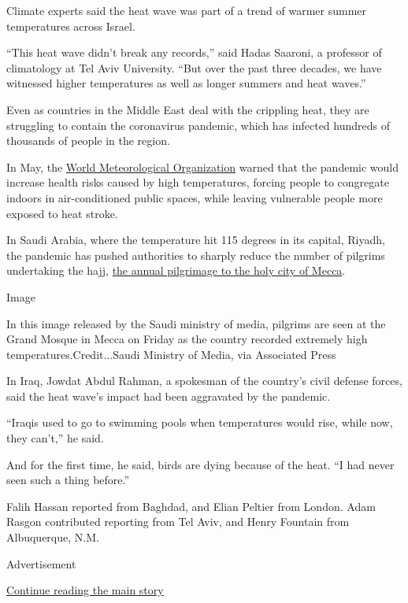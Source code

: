 Climate experts said the heat wave was part of a trend of warmer summer
temperatures across Israel.

``This heat wave didn't break any records,'' said Hadas Saaroni, a
professor of climatology at Tel Aviv University. ``But over the past
three decades, we have witnessed higher temperatures as well as longer
summers and heat waves.''

Even as countries in the Middle East deal with the crippling heat, they
are struggling to contain the coronavirus pandemic, which has infected
hundreds of thousands of people in the region.

In May, the
\href{https://public.wmo.int/en/media/news/global-partnership-urges-stronger-preparation-hot-weather-during-covid-19}{World
Meteorological Organization} warned that the pandemic would increase
health risks caused by high temperatures, forcing people to congregate
indoors in air-conditioned public spaces, while leaving vulnerable
people more exposed to heat stroke.

In Saudi Arabia, where the temperature hit 115 degrees in its capital,
Riyadh, the pandemic has pushed authorities to sharply reduce the number
of pilgrims undertaking the hajj,
\href{https://www.nytimes3xbfgragh.onion/2020/07/30/world/middleeast/pilgrims-hajj-mecca-coronavirus-pandemic.html}{the
annual pilgrimage to the holy city of Mecca}.

Image

In this image released by the Saudi ministry of media, pilgrims are seen
at the Grand Mosque in Mecca on Friday as the country recorded extremely
high temperatures.Credit...Saudi Ministry of Media, via Associated Press

In Iraq, Jowdat Abdul Rahman, a spokesman of the country's civil defense
forces, said the heat wave's impact had been aggravated by the pandemic.

``Iraqis used to go to swimming pools when temperatures would rise,
while now, they can't,'' he said.

And for the first time, he said, birds are dying because of the heat.
``I had never seen such a thing before.''

Falih Hassan reported from Baghdad, and Elian Peltier from London. Adam
Rasgon contributed reporting from Tel Aviv, and Henry Fountain from
Albuquerque, N.M.

Advertisement

\protect\hyperlink{after-bottom}{Continue reading the main story}

